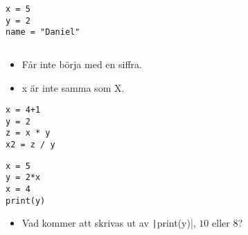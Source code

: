 \begin{frame}[fragile]
  \begin{example}[Variabler]
    \begin{verbatim}
x = 5
y = 2
name = "Daniel"
    \end{verbatim}
  \end{example}
\end{frame}

\begin{frame}[fragile]
  \inputminted[highlightlines={11-12,14,17,18,20,25,27-28},linenos,firstline=11]{python}{examples/age.py}
\end{frame}

\begin{frame}
  \begin{remark}
    \begin{itemize}
      \item Får inte börja med en siffra.
      \item x är inte samma som X.
    \end{itemize}
  \end{remark}
\end{frame}

\begin{frame}[fragile]
  \begin{example}[Heltalsoperationer]
    \begin{verbatim}
x = 4+1
y = 2
z = x * y
x2 = z / y
    \end{verbatim}
  \end{example}
\end{frame}

\begin{frame}[fragile]
  \begin{example}
    \begin{verbatim}
x = 5
y = 2*x
x = 4
print(y)
    \end{verbatim}
  \end{example}

  \begin{exercise}
    \begin{itemize}
      \item Vad kommer att skrivas ut av \texttt|print(y)|,
        \(10\) eller \(8\)?
    \end{itemize}
  \end{exercise}
\end{frame}

